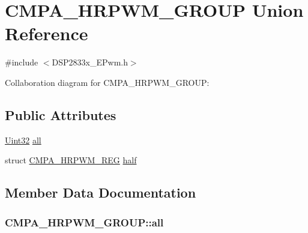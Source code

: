 \hypertarget{union_c_m_p_a___h_r_p_w_m___g_r_o_u_p}{}\section{C\+M\+P\+A\+\_\+\+H\+R\+P\+W\+M\+\_\+\+G\+R\+O\+U\+P Union Reference}
\label{union_c_m_p_a___h_r_p_w_m___g_r_o_u_p}


{\ttfamily \#include $<$D\+S\+P2833x\+\_\+\+E\+Pwm.\+h$>$}



Collaboration diagram for C\+M\+P\+A\+\_\+\+H\+R\+P\+W\+M\+\_\+\+G\+R\+O\+U\+P\+:
\subsection*{Public Attributes}
\begin{DoxyCompactItemize}
\item 
\hyperlink{_d_s_p2833x___device_8h_aba99025e657f892beb7ff31cecf64653}{Uint32} \hyperlink{union_c_m_p_a___h_r_p_w_m___g_r_o_u_p_a8ed704e5ae82c953760009c57c9d4942}{all}
\item 
struct \hyperlink{struct_c_m_p_a___h_r_p_w_m___r_e_g}{C\+M\+P\+A\+\_\+\+H\+R\+P\+W\+M\+\_\+\+R\+E\+G} \hyperlink{union_c_m_p_a___h_r_p_w_m___g_r_o_u_p_a345359ce425c4ea7cb7b5b3b13dfb906}{half}
\end{DoxyCompactItemize}


\subsection{Member Data Documentation}
\hypertarget{union_c_m_p_a___h_r_p_w_m___g_r_o_u_p_a8ed704e5ae82c953760009c57c9d4942}{}
\subsubsection[{all}]{ C\+M\+P\+A\+\_\+\+H\+R\+P\+W\+M\+\_\+\+G\+R\+O\+U\+P\+::all}\label{union_c_m_p_a___h_r_p_w_m___g_r_o_u_p_a8ed704e5ae82c953760009c57c9d4942}
\hypertarget{union_c_m_p_a___h_r_p_w_m___g_r_o_u_p_a345359ce425c4ea7cb7b5b3b13dfb906}{}
